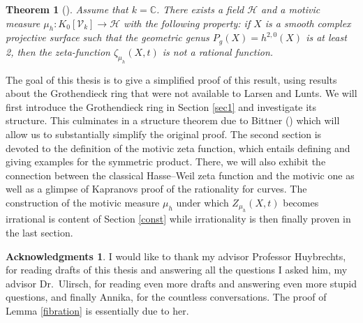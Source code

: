 \documentclass[11pt, a4paper, german, twoside]{article}
\theoremstyle{plain}
\newtheorem{theorem}{Theorem}[section]
\theoremstyle{definition}
\newtheorem*{acks}{Acknowledgments}
\newcommand{\gring}[1][k]{K_0[\mathcal{V}_#1]}
\begin{document}
\begin{theorem}[{\cite[Thm. 1.6]{MR1996804}}]
\label{irrational}
Assume that $k = \mathbb{C}$. There exists a field $\mathcal{H}$ and a motivic measure $\mu_h \colon \gring \to \mathcal{H}$ with the following
property: if $X$ is a smooth complex projective surface such that the geometric genus $P_g(X)=h^{2,0}(X)$ is at least 2, 
then the zeta-function $\zeta_{\mu_h}(X,t)$ is not a rational function.
\end{theorem}

The goal of this thesis is to give a simplified proof of this result, using results about the Grothendieck ring that were not available
to Larsen and Lunts.
We will first introduce the Grothendieck ring in Section \ref{sec1} and investigate its structure. 
This culminates in a structure theorem due to Bittner (\cite[Thm 3.1]{Bittner}) which will allow us to substantially simplify the original 
proof.
The second section is devoted to the definition of the motivic zeta function, which entails defining and giving examples for the symmetric 
product. There, we will also exhibit the connection between the classical Hasse--Weil zeta function and the motivic one as well as a glimpse of
Kapranovs proof of the rationality for curves.
The construction of the motivic measure $\mu_h$ under which $Z_{\mu_h}(X,t)$ becomes irrational is content of Section \ref{const} while irrationality
is then finally proven in the last section.

\begin{acks}
    I would like to thank my advisor Professor Huybrechts, for reading drafts of this thesis and answering all the questions I asked him, 
    my advisor Dr.\ Ulirsch, for reading even more drafts and answering even more stupid questions, and finally Annika, for the countless
    conversations. The proof of Lemma \ref{fibration} is essentially due to her.
\end{acks}
\end{document}
